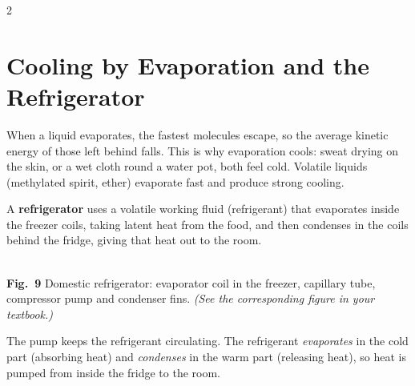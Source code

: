 \documentclass[10pt]{article}
\makeatletter
\let\theme@oldsection\section
\renewcommand{\section}{%
  \needspace{8\baselineskip}%
  \theme@oldsection}
\makeatother
\begin{document}
\begin{multicols}{2}
\section{Cooling by Evaporation and the Refrigerator}
When a liquid evaporates, the fastest molecules escape, so the average
kinetic energy of those left behind falls. This is why evaporation
cools: sweat drying on the skin, or a wet cloth round a water pot, both
feel cold. Volatile liquids (methylated spirit, ether) evaporate fast
and produce strong cooling.

\begin{definition}
A \textbf{refrigerator} uses a volatile working fluid (refrigerant)
that evaporates inside the freezer coils, taking latent heat from the
food, and then condenses in the coils behind the fridge, giving that
heat out to the room.
\end{definition}

\begin{center}
\\[2pt]
{\scriptsize\textbf{Fig.\ 9} Domestic refrigerator: evaporator coil in
the freezer, capillary tube, compressor pump and condenser fins.
\textit{(See the corresponding figure in your textbook.)}}
\end{center}

\begin{nb}
The pump keeps the refrigerant circulating. The refrigerant
\emph{evaporates} in the cold part (absorbing heat) and \emph{condenses}
in the warm part (releasing heat), so heat is pumped from inside the
fridge to the room.
\end{nb}


\end{multicols}
\end{document}
